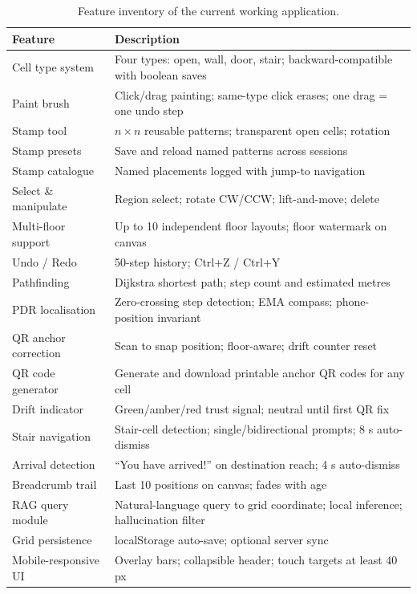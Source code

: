\documentclass[12pt,a4paper]{article}
\begin{document}
\begin{table}[H]
\centering
\caption{Feature inventory of the current working application.}
\label{tab:features}
\small
\renewcommand{\arraystretch}{1.15}
\begin{tabular}{@{}p{3.8cm}p{8.6cm}@{}}
\toprule
\textbf{Feature} & \textbf{Description} \\
\midrule
Cell type system       & Four types: open, wall, door, stair; backward-compatible with boolean saves \\
Paint brush            & Click/drag painting; same-type click erases; one drag = one undo step \\
Stamp tool             & $n{\times}n$ reusable patterns; transparent open cells; rotation \\
Stamp presets          & Save and reload named patterns across sessions \\
Stamp catalogue        & Named placements logged with jump-to navigation \\
Select \& manipulate   & Region select; rotate CW/CCW; lift-and-move; delete \\
Multi-floor support    & Up to 10 independent floor layouts; floor watermark on canvas \\
Undo / Redo            & 50-step history; Ctrl+Z / Ctrl+Y \\
Pathfinding            & Dijkstra shortest path; step count and estimated metres \\
PDR localisation       & Zero-crossing step detection; EMA compass; phone-position invariant \\
QR anchor correction   & Scan to snap position; floor-aware; drift counter reset \\
QR code generator      & Generate and download printable anchor QR codes for any cell \\
Drift indicator        & Green/amber/red trust signal; neutral until first QR fix \\
Stair navigation       & Stair-cell detection; single/bidirectional prompts; 8 s auto-dismiss \\
Arrival detection      & ``You have arrived!'' on destination reach; 4 s auto-dismiss \\
Breadcrumb trail       & Last 10 positions on canvas; fades with age \\
RAG query module       & Natural-language query to grid coordinate; local inference; hallucination filter \\
Grid persistence       & localStorage auto-save; optional server sync \\
Mobile-responsive UI   & Overlay bars; collapsible header; touch targets at least 40 px \\
\bottomrule
\end{tabular}
\end{table}
\end{document}
